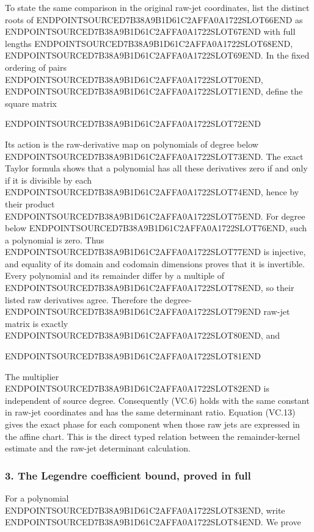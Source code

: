 To state the same comparison in the original raw-jet coordinates, list the distinct roots of ENDPOINTSOURCED7B38A9B1D61C2AFFA0A1722SLOT66END as ENDPOINTSOURCED7B38A9B1D61C2AFFA0A1722SLOT67END with full lengths ENDPOINTSOURCED7B38A9B1D61C2AFFA0A1722SLOT68END, ENDPOINTSOURCED7B38A9B1D61C2AFFA0A1722SLOT69END. In the fixed ordering of pairs ENDPOINTSOURCED7B38A9B1D61C2AFFA0A1722SLOT70END, ENDPOINTSOURCED7B38A9B1D61C2AFFA0A1722SLOT71END, define the square matrix

ENDPOINTSOURCED7B38A9B1D61C2AFFA0A1722SLOT72END

Its action is the raw-derivative map on polynomials of degree below ENDPOINTSOURCED7B38A9B1D61C2AFFA0A1722SLOT73END. The exact Taylor formula shows that a polynomial has all these derivatives zero if and only if it is divisible by each ENDPOINTSOURCED7B38A9B1D61C2AFFA0A1722SLOT74END, hence by their product ENDPOINTSOURCED7B38A9B1D61C2AFFA0A1722SLOT75END. For degree below ENDPOINTSOURCED7B38A9B1D61C2AFFA0A1722SLOT76END, such a polynomial is zero. Thus ENDPOINTSOURCED7B38A9B1D61C2AFFA0A1722SLOT77END is injective, and equality of its domain and codomain dimensions proves that it is invertible. Every polynomial and its remainder differ by a multiple of ENDPOINTSOURCED7B38A9B1D61C2AFFA0A1722SLOT78END, so their listed raw derivatives agree. Therefore the degree-ENDPOINTSOURCED7B38A9B1D61C2AFFA0A1722SLOT79END raw-jet matrix is exactly ENDPOINTSOURCED7B38A9B1D61C2AFFA0A1722SLOT80END, and

ENDPOINTSOURCED7B38A9B1D61C2AFFA0A1722SLOT81END

The multiplier ENDPOINTSOURCED7B38A9B1D61C2AFFA0A1722SLOT82END is independent of source degree. Consequently (VC.6) holds with the same constant in raw-jet coordinates and has the same determinant ratio. Equation (VC.13) gives the exact phase for each component when those raw jets are expressed in the affine chart. This is the direct typed relation between the remainder-kernel estimate and the raw-jet determinant calculation.

\subsubsection{3. The Legendre coefficient bound, proved in full}\label{endpoint-volume_connection_original--the-legendre-coefficient-bound-proved-in-full}

For a polynomial ENDPOINTSOURCED7B38A9B1D61C2AFFA0A1722SLOT83END, write ENDPOINTSOURCED7B38A9B1D61C2AFFA0A1722SLOT84END. We prove

